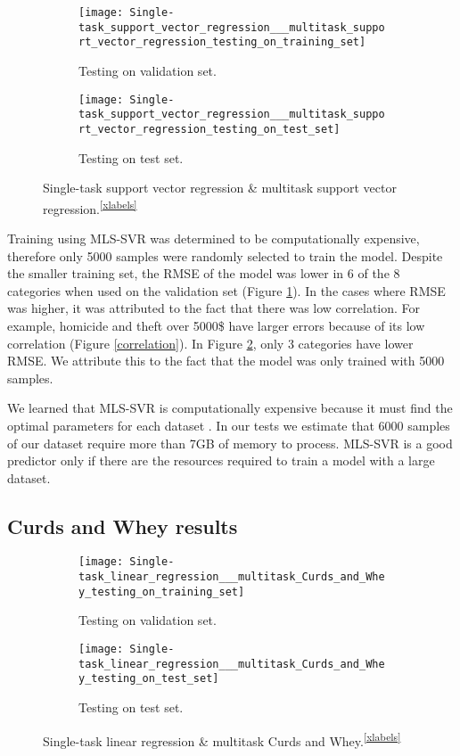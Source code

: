 \documentclass{article}
\begin{document}
\begin{figure}[h]
    \begin{subfigure}[b]{0.5\textwidth}
        \texttt{[image: Single-task\_support\_vector\_regression\_\_\_multitask\_support\_vector\_regression\_testing\_on\_training\_set]}
        \caption{Testing on validation set. \label{fig:svrtraining}}
    \end{subfigure}
    \begin{subfigure}[b]{0.5\textwidth}
        \texttt{[image: Single-task\_support\_vector\_regression\_\_\_multitask\_support\_vector\_regression\_testing\_on\_test\_set]}
        \caption{Testing on test set. \label{fig:svrtest}}
    \end{subfigure}
      \caption{Single-task support vector regression \& multitask support vector regression.\textsuperscript{\ref{xlabels}}}
 \label{svr_base}
\end{figure}

Training using MLS-SVR was determined to be computationally expensive, therefore only 5000 samples were randomly selected to train the model. Despite the smaller training set, the RMSE of the model was lower in 6 of  the 8 categories when used on the validation set (Figure \ref{fig:svrtraining}). In the cases where RMSE was higher, it was attributed to the fact that there was low correlation. For example,  homicide and theft over 5000\$ have larger errors because of its low correlation (Figure \ref{correlation}). In Figure \ref{fig:svrtest}, only 3 categories have lower RMSE. We attribute this to the fact that the model was only trained with 5000 samples.

We learned that MLS-SVR is computationally expensive because it must find the optimal parameters for each dataset \citep{xu_multi-output_2013}. In our tests we estimate that 6000 samples of our dataset require more than 7GB of memory to process. MLS-SVR is a good predictor only if there are the resources required to train a model with a large dataset.

\subsection{Curds and Whey results}

\begin{figure}[h]
    \begin{subfigure}[b]{0.5\textwidth}
        \texttt{[image: Single-task\_linear\_regression\_\_\_multitask\_Curds\_and\_Whey\_testing\_on\_training\_set]}
        \caption{Testing on validation set. \label{fig:ctraining}}
    \end{subfigure}
    \begin{subfigure}[b]{0.5\textwidth}
        \texttt{[image: Single-task\_linear\_regression\_\_\_multitask\_Curds\_and\_Whey\_testing\_on\_test\_set]}
        \caption{Testing on test set. \label{fig:ctest}}
    \end{subfigure}
      \caption{Single-task linear regression \& multitask Curds and Whey.\textsuperscript{\ref{xlabels}}}
 \label{curds_base}
\end{figure}
\end{document}
